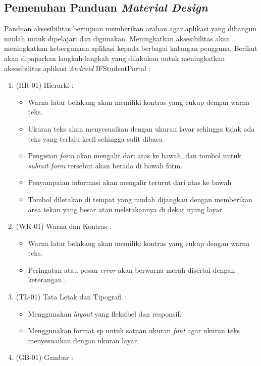 \subsection{Pemenuhan Panduan \textit{Material Design}}
Panduan aksesibilitas bertujuan memberikan arahan agar aplikasi yang dibangun mudah untuk dipelajari dan digunakan. Meningkatkan aksesibilitas akan meningkatkan kebergunaan aplikasi kepada berbagai kalangan pengguna. Berikut akan dipaparkan langkah-langkah yang dilakukan untuk meningkatkan aksesibilitas aplikasi \textit{Android} IFStudentPortal :
\begin{enumerate} 
    \item (HR-01) Hierarki : 
    \begin{itemize}
        \item Warna latar belakang akan memiliki kontras yang cukup dengan warna teks.
        \item Ukuran teks akan menyesuaikan dengan ukuran layar sehingga tidak ada teks yang terlalu kecil sehingga sulit dibaca
        \item Pengisian \textit{form} akan mengalir dari atas ke bawah, dan tombol untuk \textit{submit form} tersebut akan berada di bawah form.
        \item Penyampaian informasi akan mengalir terurut dari atas ke bawah
        \item Tombol diletakan di tempat yang mudah dijangkau dengan memberikan area tekan yang besar atau meletakannya di dekat ujung layar.
    \end{itemize}
    \item (WK-01) Warna dan Kontras : 
    \begin{itemize}
        \item Warna latar belakang akan memiliki kontras yang cukup dengan warna teks.
        \item Peringatan atau pesan \textit{error} akan berwarna merah disertai dengan keterangan .
    \end{itemize}
    \item (TL-01) Tata Letak dan Tipografi : 
    \begin{itemize}
        \item Menggunakan \textit{layout} yang fleksibel dan responsif.
        \item Menggunakan format sp untuk satuan ukuran \textit{font} agar ukuran teks menyesuaikan dengan ukuran layar.
        \end{itemize}
    \item (GB-01) Gambar : 

\end{enumerate}
